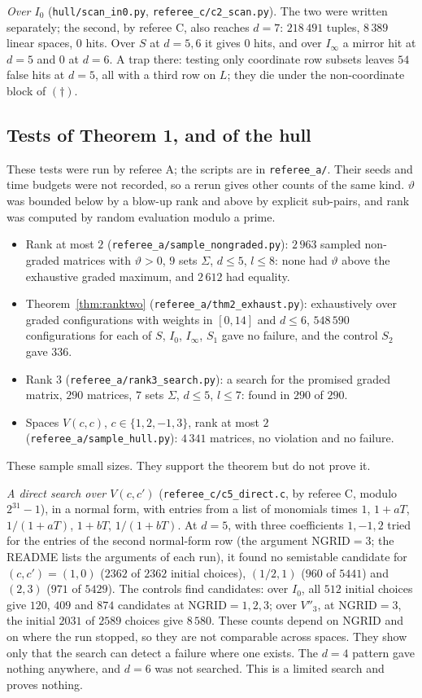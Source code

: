 \documentclass[11pt,a4paper]{article}
\theoremstyle{plain}
\theoremstyle{definition}
\newcommand{\vth}{\vartheta}
\newcommand{\Iz}{I_{0}}
\newcommand{\Ii}{I_{\infty}}
\newcommand{\scr}[1]{\nolinkurl{#1}}
\begin{document}
\emph{Over $\Iz$} (\scr{hull/scan_in0.py}, \scr{referee_c/c2_scan.py}). The two were written separately; the second, by referee C, also reaches $d=7$: $218\,491$ tuples, $8\,389$ linear spaces, $0$ hits. Over $S$ at $d=5,6$ it gives $0$ hits, and over $\Ii$ a mirror hit at $d=5$ and $0$ at $d=6$. A trap there: testing only coordinate row subsets leaves $54$ false hits at $d=5$, all with a third row on $L$; they die under the non-coordinate block of $(\dagger)$.

\subsection{Tests of Theorem 1, and of the hull}

These tests were run by referee A; the scripts are in \scr{referee_a/}. Their seeds and time budgets were not recorded, so a rerun gives other counts of the same kind. $\vth$ was bounded below by a blow-up rank and above by explicit sub-pairs, and rank was computed by random evaluation modulo a prime.
\begin{itemize}
\item Rank at most $2$ (\scr{referee_a/sample_nongraded.py}): $2\,963$ sampled non-graded matrices with $\vth>0$, $9$ sets $\Sigma$, $d\le5$, $l\le8$: none had $\vth$ above the exhaustive graded maximum, and $2\,612$ had equality.
\item Theorem~\ref{thm:ranktwo} (\scr{referee_a/thm2_exhaust.py}): exhaustively over graded configurations with weights in $[0,14]$ and $d\le6$, $548\,590$ configurations for each of $S$, $\Iz$, $\Ii$, $S_{1}$ gave no failure, and the control $S_{2}$ gave $336$.
\item Rank $3$ (\scr{referee_a/rank3_search.py}): a search for the promised graded matrix, $290$ matrices, $7$ sets $\Sigma$, $d\le5$, $l\le7$: found in $290$ of $290$.
\item Spaces $V(c,c)$, $c\in\{1,2,-1,3\}$, rank at most $2$ (\scr{referee_a/sample_hull.py}): $4\,341$ matrices, no violation and no failure.
\end{itemize}
These sample small sizes. They support the theorem but do not prove it.

\emph{A direct search over $V(c,c')$} (\scr{referee_c/c5_direct.c}, by referee C, modulo $2^{31}-1$), in a normal form, with entries from a list of monomials times $1$, $1+aT$, $1/(1+aT)$, $1+bT$, $1/(1+bT)$. At $d=5$, with three coefficients $1,-1,2$ tried for the entries of the second normal-form row (the argument NGRID${}=3$; the README lists the arguments of each run), it found no semistable candidate for $(c,c')=(1,0)$ ($2362$ of $2362$ initial choices), $(1/2,1)$ ($960$ of $5441$) and $(2,3)$ ($971$ of $5429$). The controls find candidates: over $\Iz$, all $512$ initial choices give $120$, $409$ and $874$ candidates at NGRID${}=1,2,3$; over $V''_{3}$, at NGRID${}=3$, the initial $2031$ of $2589$ choices give $8\,580$. These counts depend on NGRID and on where the run stopped, so they are not comparable across spaces. They show only that the search can detect a failure where one exists. The $d=4$ pattern gave nothing anywhere, and $d=6$ was not searched. This is a limited search and proves nothing.
\end{document}
